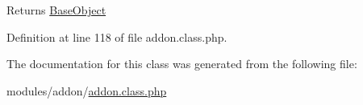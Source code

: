 \begin{DoxyReturn}{Returns}
\hyperlink{classBaseObject}{Base\-Object} 
\end{DoxyReturn}


Definition at line 118 of file addon.\-class.\-php.



The documentation for this class was generated from the following file\-:\begin{DoxyCompactItemize}
\item 
modules/addon/\hyperlink{addon_8class_8php}{addon.\-class.\-php}\end{DoxyCompactItemize}
